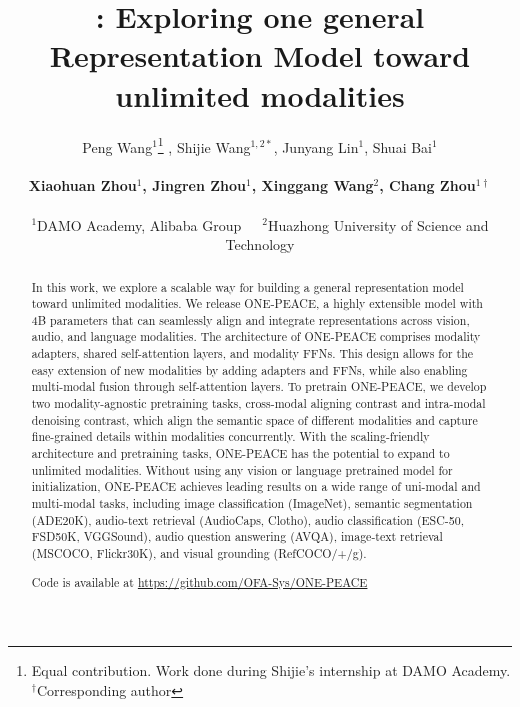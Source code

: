 \documentclass{article}
\title{{\modeltitle}: Exploring one general Representation Model toward unlimited modalities}
\author{
   Peng Wang$^{1}$\thanks{Equal contribution. Work done during Shijie’s internship at DAMO Academy. $^\dag$Corresponding author} ,
   Shijie Wang$^{1,2*}$, Junyang Lin$^{1}$, Shuai Bai$^{1}$\\\\ 
   \textbf{Xiaohuan Zhou$^{1}$, Jingren Zhou$^{1}$, Xinggang Wang$^{2}$, Chang Zhou$^{1\dag}$
   } \\\\
   $^1$DAMO Academy, Alibaba Group\ \ \ $^2$Huazhong University of Science and Technology
}
\newcommand{\onepeace}{ONE-PEACE\xspace}
\begin{document}
\maketitle


\begin{abstract}
In this work, we explore a scalable way for building a general representation model toward unlimited modalities.
We release \onepeace, a highly extensible model with 4B parameters that can seamlessly align and integrate representations across vision, audio, and language modalities.
The architecture of \onepeace comprises modality adapters, shared self-attention layers, and modality FFNs. 
This design allows for the easy extension of new modalities by adding adapters and FFNs, while also enabling multi-modal fusion through self-attention layers.
To pretrain \onepeace, we develop two modality-agnostic pretraining tasks, cross-modal aligning contrast and intra-modal denoising contrast, which align the semantic space of different modalities and capture fine-grained details within modalities concurrently.
With the scaling-friendly architecture and pretraining tasks, \onepeace has the potential to expand to unlimited modalities.
Without using any vision or language pretrained model for initialization, \onepeace achieves leading results on a wide range of uni-modal and multi-modal tasks, including image classification (ImageNet), semantic segmentation (ADE20K), audio-text retrieval (AudioCaps, Clotho), audio classification (ESC-50, FSD50K, VGGSound), audio question answering (AVQA), image-text retrieval (MSCOCO, Flickr30K), and visual grounding (RefCOCO/+/g).

\smallskip
\centering
Code is available at \url{https://github.com/OFA-Sys/ONE-PEACE}
\end{abstract}
\end{document}
